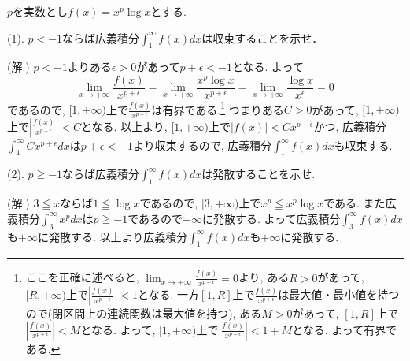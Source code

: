 \documentclass[dvipdfmx,a4paper,11pt]{article}
\theoremstyle{definition}
\begin{document}
{\large$p$を実数とし$f(x) = x^p \log x$とする. }
\vspace{11pt}

{\large(1). $p< -1$ならば広義積分$\int_{1}^{\infty} f(x) dx$は収束することを示せ．}

\hspace{-11pt}(解.)
$p<-1$よりある$\epsilon >0$があって$p+\epsilon<-1$となる.
よって
$$
\lim_{x \rightarrow +\infty}\frac{f(x)}{x^{p+\epsilon}}=
\lim_{x \rightarrow +\infty}\frac{x^p \log x}{x^{p+\epsilon}}
=\lim_{x \rightarrow +\infty}\frac{\log x}{x^{\epsilon}}
=0
$$
であるので, $[1, + \infty)$上で$\frac{f(x)}{x^{p+\epsilon}}$は有界である.\footnote{ここを正確に述べると, $\lim_{x \rightarrow +\infty}\frac{f(x)}{x^{p+\epsilon}}=0$より, ある$R>0$があって, $[R, + \infty)$上で$|\frac{f(x)}{x^{p+\epsilon}}| <1$となる. 一方$[1,R]$上で$\frac{f(x)}{x^{p+\epsilon}}$は最大値・最小値を持つので(閉区間上の連続関数は最大値を持つ), ある$M>0$があって,  $[1, R]$上で$|\frac{f(x)}{x^{p+\epsilon}}| <M$となる. よって, $[1, + \infty)$上で$|\frac{f(x)}{x^{p+\epsilon}}| < 1+M$となる. よって有界である.}
つまりある$C>0$があって, $[1, + \infty)$上で$|\frac{f(x)}{x^{p+\epsilon}}| < C$となる.
以上より, $[1, + \infty)$上で$|f(x)| < C{x^{p+\epsilon}}$かつ, 広義積分$\int_{1}^{\infty}C{x^{p+\epsilon}}dx$は$p+\epsilon<-1$より収束するので, 広義積分$\int_{1}^{\infty} f(x) dx$も収束する.

\vspace{11pt}

{\large(2). $p\geqq -1$ならば広義積分$\int_{1}^{\infty} f(x) dx$は発散することを示せ.}

\hspace{-11pt}(解.)
$3 \leqq x$ならば$1 \leqq \log x$であるので, $[3, + \infty)$上で$x^p\leqq x^p\log x$である. また広義積分$\int_{3}^{\infty} x^p dx$は$p\geqq -1$であるので$+ \infty$に発散する. よって広義積分$\int_{3}^{\infty} f(x) dx$も$+ \infty$に発散する. 以上より広義積分$\int_{1}^{\infty} f(x) dx$も$+ \infty$に発散する.





  


 
 
\end{document}
